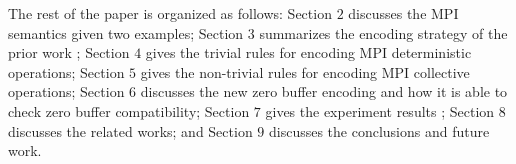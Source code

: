 The rest of the paper is organized as follows: Section $2$ discusses the MPI semantics given two examples; Section $3$ summarizes the encoding strategy of the prior work \cite{DBLP:conf/kbse/HuangMM13}; Section $4$ gives the trivial rules for encoding MPI deterministic operations; Section $5$ gives the non-trivial rules for encoding MPI collective operations; Section $6$ discusses the new zero buffer encoding and how it is able to check zero buffer compatibility; Section $7$ gives the experiment results ; Section $8$ discusses the related works; and Section $9$ discusses the conclusions and future work.

\examplefigone


           